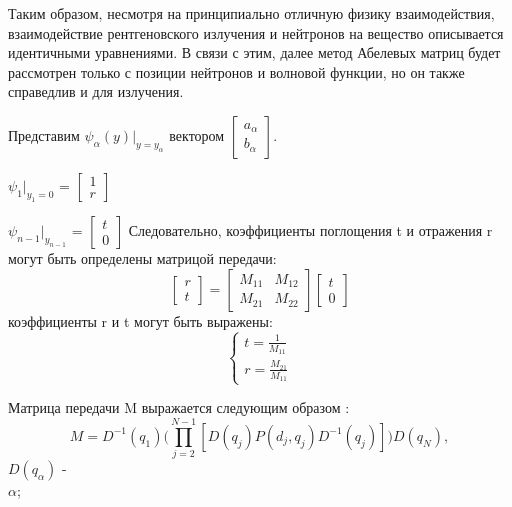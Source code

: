 \documentclass[a4paper]{article}
\begin{document}
Таким образом, несмотря на принципиально отличную физику взаимодействия, взаимодействие рентгеновского излучения и нейтронов на вещество описывается идентичными уравнениями. В связи с этим, далее метод Абелевых матриц будет рассмотрен только с позиции нейтронов и волновой функции, но он также справедлив и для излучения.

Представим $ \psi_{\alpha}(y)|_{y = y_{\alpha}}$ вектором \(
\begin{bmatrix}
a_{\alpha}\\
b_{\alpha}
\end{bmatrix}
\).

$\psi_1 |_{y_1 = 0}$ = \(
\begin{bmatrix}
1\\
r
\end{bmatrix}
\) 

 $\psi_{n-1} |_{y_{n-1}}$ = \(
\begin{bmatrix}
t\\
0
\end{bmatrix} 
\) 
Следовательно, коэффициенты поглощения t и отражения r могут быть определены матрицой передачи:
\begin{equation}
\begin{bmatrix}
r\\
t
\end{bmatrix} = 
\begin{bmatrix}
M_{11} & M_{12}\\
M_{21} & M_{22}
\end{bmatrix}
\begin{bmatrix}
t\\
0
\end{bmatrix} 
\end{equation}
 коэффициенты r и t могут быть выражены: 
\begin{equation}
    \begin{cases}
        t = \frac{1}{M_{11}}\\ 
        r = \frac{M_{21}}{M_{11}} 
    \end{cases}
\end{equation}

Матрица передачи M выражается следующим образом \cite{9} :
\begin{equation}
    M = D^{-1}(q_1)\Bigg(\prod\limits_{j=2}^{N-1}[D(q_j)P(d_j , q_j)D^{-1}(q_j)]\Bigg)D(q_N),
\end{equation}  $D(q_{\alpha})$ -  \\
  $\alpha$;
\end{document}

